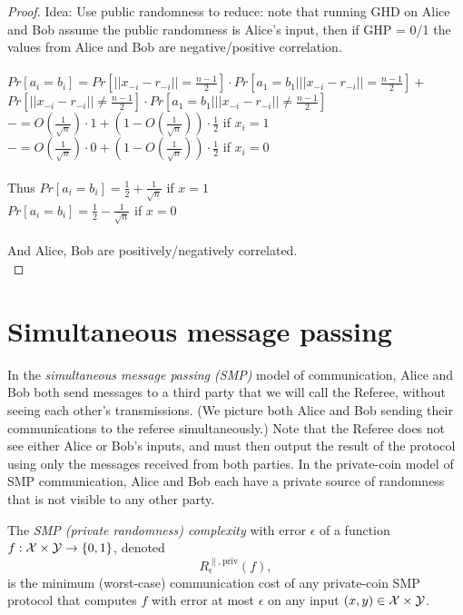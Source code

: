 \begin{proof}
	Idea: Use public randomness to reduce: note that running GHD on Alice and Bob assume the public randomness is Alice's input, then if GHP = 0/1 the values from Alice and Bob are negative/positive correlation.\\
	\\
	$Pr[a_i=b_i] =Pr[||x_{-i}-r_{-i}||=\frac{n-1}{2}]\cdot Pr[a_1=b_1| ||x_{-i}-r_{-i}||=\frac{n-1}{2}]+$\\
	$Pr[||x_{-i}-r_{-i}||\neq\frac{n-1}{2}]\cdot Pr[a_1=b_1| ||x_{-i}-r_{-i}||\neq\frac{n-1}{2}]$ \\
	$-=O(\frac{1}{\sqrt{n}})\cdot 1+(1-O(\frac{1}{\sqrt{n}}))\cdot \frac12$ if $x_i=1$\\
	$-=O(\frac{1}{\sqrt{n}})\cdot 0+(1-O(\frac{1}{\sqrt{n}}))\cdot \frac12$ if $x_i=0$\\
	\\
	Thus $Pr[a_i=b_i]=\frac12+\frac{1}{\sqrt{n}}$ if $x=1$\\
	$Pr[a_i=b_i]=\frac12-\frac{1}{\sqrt{n}}$ if $x=0$\\ 
	\\
	And Alice, Bob are positively/negatively correlated.\\
	
\end{proof}



\section{Simultaneous message passing}

In the \emph{simultaneous message passing (SMP)} model of communication, Alice and Bob both send messages to a third party that we will call the Referee, without seeing each other's transmissions. (We picture both Alice and Bob sending their communications to the referee simultaneously.) Note that the Referee does not see either Alice or Bob's inputs, and must then output the result of the protocol using only the messages received from both parties. In the private-coin model of SMP communication, Alice and Bob each have a private source of randomness that is not visible to any other party.

\begin{definition}
	The \emph{SMP (private randomness) complexity} with error $\epsilon$ of a function $f : \mathcal{X} \times \mathcal{Y} \to \{0,1\}$, denoted
	\[
	R^{\parallel,\mathrm{priv}}_\epsilon(f),
	\] 
	is the minimum (worst-case) communication cost of any private-coin SMP protocol that computes $f$ with error at most $\epsilon$ on any input $(x,y) \in \mathcal{X} \times \mathcal{Y}$.
\end{definition}

